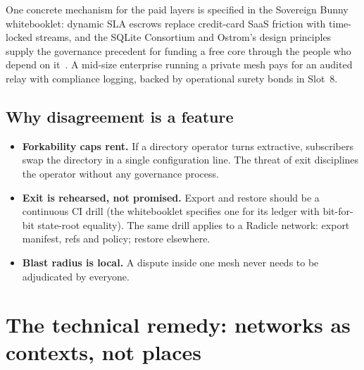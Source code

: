 \documentclass[a4paper,11pt,twoside,parskip=half-,headings=small]{scrartcl}
\begin{document}
One concrete mechanism for the paid layers is specified in the Sovereign Bunny
whitebooklet: dynamic SLA escrows replace credit-card SaaS friction with time-locked
streams, and the SQLite Consortium and Ostrom's design principles supply the governance
precedent for funding a free core through the people who depend on it~\cite{ostrom1990,sqlite2025}.
A mid-size enterprise running a private mesh pays for an audited relay with compliance
logging, backed by operational surety bonds in Slot~8.

\subsection{Why disagreement is a feature}
\begin{itemize}
  \item \textbf{Forkability caps rent.} If a directory operator turns extractive, subscribers
        swap the directory in a single configuration line. The threat of exit disciplines
        the operator without any governance process.
  \item \textbf{Exit is rehearsed, not promised.} Export and restore
        should be a continuous CI drill (the whitebooklet specifies one for its ledger with bit-for-bit state-root equality).
        The same drill applies to a Radicle network: export manifest, refs and policy; restore elsewhere.
  \item \textbf{Blast radius is local.} A dispute inside one mesh never needs to be
        adjudicated by everyone.
\end{itemize}

\section{The technical remedy: networks as contexts, not places}
\label{sec:remedy}
\end{document}
